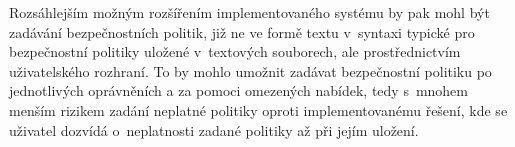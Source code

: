Rozsáhlejším možným rozšířením implementovaného systému by pak mohl být zadávání bezpečnostních politik, již ne ve formě textu v~syntaxi typické pro bezpečnostní politiky uložené v~textových souborech, ale prostřednictvím uživatelského rozhraní.
To by mohlo umožnit zadávat bezpečnostní politiku po jednotlivých oprávněních a za pomoci omezených nabídek, tedy s~mnohem menším rizikem zadání neplatné politiky oproti implementovanému řešení, kde se uživatel dozvídá o~neplatnosti zadané politiky až při jejím uložení.


